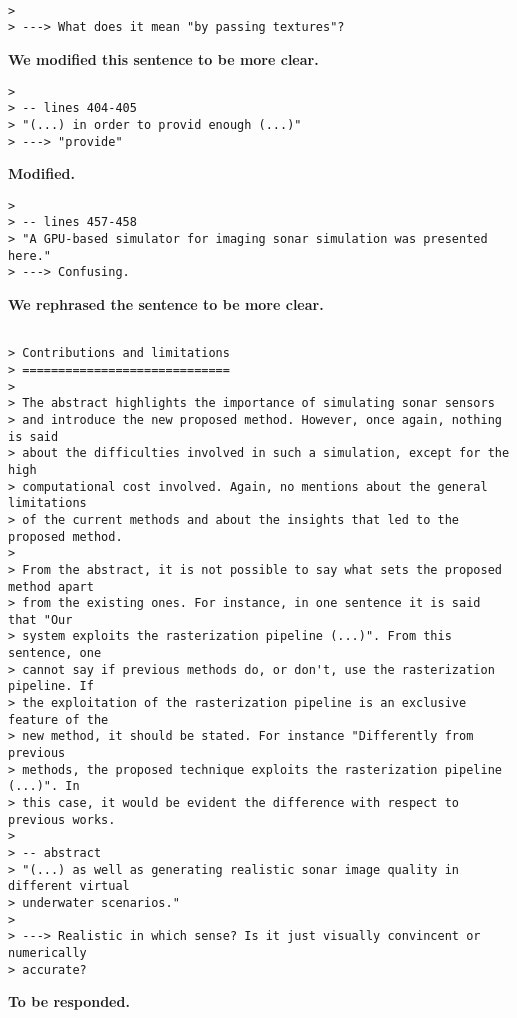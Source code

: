 \documentclass{article}
\begin{document}
\begin{verbatim}

>
> ---> What does it mean "by passing textures"?

\end{verbatim}

\textbf{We modified this sentence to be more clear.}

\begin{verbatim}
>
> -- lines 404-405
> "(...) in order to provid enough (...)"
> ---> "provide"
\end{verbatim}

\textbf{Modified.}

\begin{verbatim}
>
> -- lines 457-458
> "A GPU-based simulator for imaging sonar simulation was presented here."
> ---> Confusing.
\end{verbatim}

\textbf{We rephrased the sentence to be more clear.}

\begin{verbatim}

> Contributions and limitations
> =============================
>
> The abstract highlights the importance of simulating sonar sensors
> and introduce the new proposed method. However, once again, nothing is said
> about the difficulties involved in such a simulation, except for the high
> computational cost involved. Again, no mentions about the general limitations
> of the current methods and about the insights that led to the proposed method.
>
> From the abstract, it is not possible to say what sets the proposed method apart
> from the existing ones. For instance, in one sentence it is said that "Our
> system exploits the rasterization pipeline (...)". From this sentence, one
> cannot say if previous methods do, or don't, use the rasterization pipeline. If
> the exploitation of the rasterization pipeline is an exclusive feature of the
> new method, it should be stated. For instance "Differently from previous
> methods, the proposed technique exploits the rasterization pipeline (...)". In
> this case, it would be evident the difference with respect to previous works.
>
> -- abstract
> "(...) as well as generating realistic sonar image quality in different virtual
> underwater scenarios."
>
> ---> Realistic in which sense? Is it just visually convincent or numerically
> accurate?
\end{verbatim}

\textbf{To be responded.}
\end{document}
